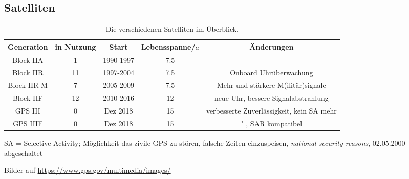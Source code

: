 \subsection{Satelliten}
\begin{table}
    \caption{Die verschiedenen Satelliten im Überblick.}
    \label{tab:satelliten}
    \begin{tabular}{c S[table-format=2.0] c S[table-format=2.1] c}
        \toprule
        {Generation} & {in Nutzung} & {Start} & {Lebensspanne\;/\;$a$} & {Änderungen} \\
        \midrule
        Block IIA   &  1 & 1990-1997 & 7.5 & \\
        Block IIR   & 11 & 1997-2004 & 7.5 & Onboard Uhrüberwachung \\
        Block IIR-M &  7 & 2005-2009 & 7.5 & Mehr und stärkere M(ilitär)signale \\
        Block IIF   & 12 & 2010-2016 & 12  & neue Uhr, bessere Signalabstrahlung \\
        GPS III     &  0 & Dez 2018  & 15  & verbesserte Zuverlässigkeit, kein SA mehr \\
        GPS IIIF    &  0 & Dez 2018  & 15  & " , SAR kompatibel \\
        \bottomrule
    \end{tabular}
\end{table}
SA = Selective Activity; Möglichkeit das zivile GPS zu stören, falsche Zeiten einzuspeisen, \textit{national security reasons}, 02.05.2000 abgeschaltet

Bilder auf \url{https://www.gps.gov/multimedia/images/}
